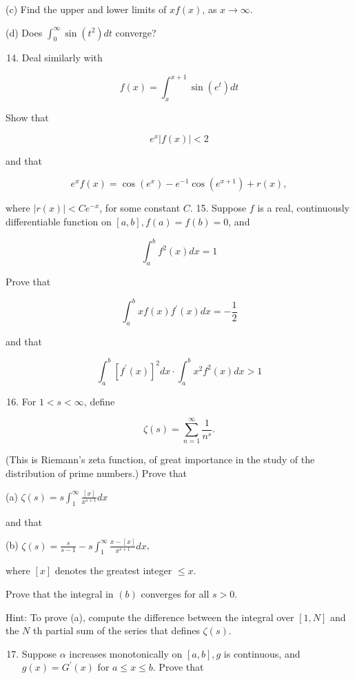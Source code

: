 \documentclass[10pt]{article}
\begin{document}
(c) Find the upper and lower limits of $x f(x)$, as $x \rightarrow \infty$.

(d) Does $\int_{0}^{\infty} \sin \left(t^{2}\right) d t$ converge?

\begin{enumerate}
  \setcounter{enumi}{13}
  \item Deal similarly with
\end{enumerate}

$$
f(x)=\int_{x}^{x+1} \sin \left(e^{t}\right) d t
$$

Show that

$$
e^{x}|f(x)|<2
$$

and that

$$
e^{x} f(x)=\cos \left(e^{x}\right)-e^{-1} \cos \left(e^{x+1}\right)+r(x),
$$

where $|r(x)|<C e^{-x}$, for some constant $C$. 15. Suppose $f$ is a real, continuously differentiable function on $[a, b], f(a)=f(b)=0$, and

$$
\int_{a}^{b} f^{2}(x) d x=1
$$

Prove that

$$
\int_{a}^{b} x f(x) f^{\prime}(x) d x=-\frac{1}{2}
$$

and that

$$
\int_{a}^{b}\left[f^{\prime}(x)\right]^{2} d x \cdot \int_{a}^{b} x^{2} f^{2}(x) d x>1
$$

\begin{enumerate}
  \setcounter{enumi}{15}
  \item For $1<s<\infty$, define
\end{enumerate}

$$
\zeta(s)=\sum_{n=1}^{\infty} \frac{1}{n^{s}} .
$$

(This is Riemann's zeta function, of great importance in the study of the distribution of prime numbers.) Prove that

(a) $\zeta(s)=s \int_{1}^{\infty} \frac{[x]}{x^{s+1}} d x$

and that

(b) $\zeta(s)=\frac{s}{s-1}-s \int_{1}^{\infty} \frac{x-[x]}{x^{s+1}} d x$,

where $[x]$ denotes the greatest integer $\leq x$.

Prove that the integral in $(b)$ converges for all $s>0$.

Hint: To prove (a), compute the difference between the integral over $[1, N]$ and the $N$ th partial sum of the series that defines $\zeta(s)$.

\begin{enumerate}
  \setcounter{enumi}{16}
  \item Suppose $\alpha$ increases monotonically on $[a, b], g$ is continuous, and $g(x)=G^{\prime}(x)$ for $a \leq x \leq b$. Prove that
\end{enumerate}
\end{document}
